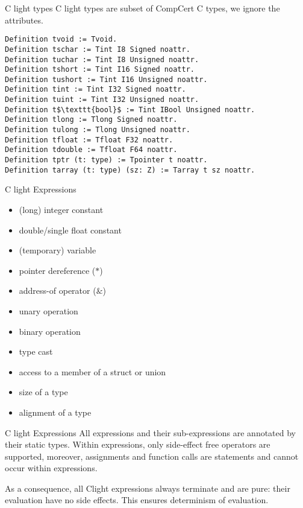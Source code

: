 \documentclass{beamer}
\begin{document}
\begin{frame}[fragile]{C light types}
  C light types are subset of CompCert C types, we ignore the attributes.
  \begin{lstlisting}[language=Coq]
Definition tvoid := Tvoid.
Definition tschar := Tint I8 Signed noattr.
Definition tuchar := Tint I8 Unsigned noattr.
Definition tshort := Tint I16 Signed noattr.
Definition tushort := Tint I16 Unsigned noattr.
Definition tint := Tint I32 Signed noattr.
Definition tuint := Tint I32 Unsigned noattr.
Definition t$\texttt{bool}$ := Tint IBool Unsigned noattr.
Definition tlong := Tlong Signed noattr.
Definition tulong := Tlong Unsigned noattr.
Definition tfloat := Tfloat F32 noattr.
Definition tdouble := Tfloat F64 noattr.
Definition tptr (t: type) := Tpointer t noattr.
Definition tarray (t: type) (sz: Z) := Tarray t sz noattr.
\end{lstlisting}

\end{frame}

\begin{frame}{C light Expressions}
  \begin{itemize}
  \item (long) integer constant
  \item double/single float constant
  \item (temporary) variable
  \item pointer dereference ($*$)
  \item address-of operator ($\&$)
  \item unary operation
  \item binary operation
  \item type cast
  \item access to a member of a struct or union
  \item size of a type
    \item alignment of a type
    \end{itemize}
  \end{frame}

  \begin{frame}{C light Expressions}
    All expressions and their sub-expressions
are annotated by their static types. Within expressions, only side-effect free operators are supported, moreover, assignments and
function calls are statements and cannot occur within expressions.
\bigskip

As a
consequence, all Clight expressions always terminate and are pure: their evaluation
have no side effects. This ensures determinism of evaluation.
    \end{frame}
\end{document}
